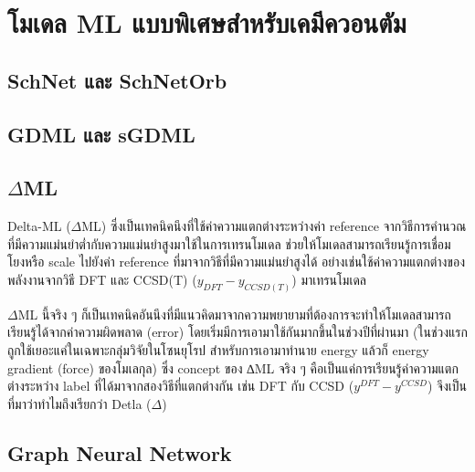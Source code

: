 

\chapter{โมเดล ML แบบพิเศษสำหรับเคมีควอนตัม}
\label{ch:chem_ml}

\section{SchNet และ SchNetOrb}

\section{GDML และ sGDML}

\section{$\Delta$ML}

Delta-ML ($\Delta$ML) ซึ่งเป็นเทคนิคนึงที่ใช้ค่าความแตกต่างระหว่างค่า reference จากวิธีการคำนวณที่มีความแม่นยำต่ำกับความแม่นยำสูงมาใช้ในการเทรนโมเดล 
ช่วยให้โมเดลสามารถเรียนรู้การเชื่อมโยงหรือ scale ไปยังค่า reference ที่มาจากวิธีที่มีความแม่นยำสูงได้ 
อย่างเช่นใช้ค่าความแตกต่างของพลังงานจากวิธี DFT และ CCSD(T) ($y_{DFT} - y_{CCSD(T)}$) มาเทรนโมเดล

$\Delta$ML นี้จริง ๆ ก็เป็นเทคนิคอันนึงที่มีแนวคิดมาจากความพยายามที่ต้องการจะทำให้โมเดลสามารถเรียนรู้ได้จากค่าความผิดพลาด (error) 
โดยเริ่มมีการเอามาใช้กันมากขึ้นในช่วงปีที่ผ่านมา (ในช่วงแรกถูกใช้เยอะแค่ในเฉพาะกลุ่มวิจัยในโซนยุโรป สำหรับการเอามาทำนาย energy 
แล้วก็ energy gradient (force) ของโมเลกุล) ซึ่ง concept ของ ∆ML จริง ๆ คือเป็นแค่การเรียนรู้ค่าความแตกต่างระหว่าง label 
ที่ได้มาจากสองวิธีที่แตกต่างกัน เช่น DFT กับ CCSD ($y^{DFT} - y^{CCSD}$) จึงเป็นที่มาว่าทำไมถึงเรียกว่า Detla ($\Delta$)

\section{Graph Neural Network}

